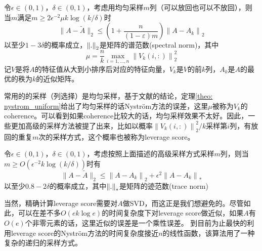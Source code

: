 \begin{theorem}
    \label{theo: nystrom_uniform}
    令$\epsilon \in (0,1)$，$\delta \in (0,1)$，考虑用均匀采样$m$列（可以放回也可以不放回），则当$m$满足$m \geq 2 \epsilon^{-2} \mu k \log (k / \delta)$时
    \begin{equation*}
        \|A-\tilde{A}\|_{2} \leq\left(1+\frac{n}{(1-\varepsilon) m}\right)\left\|A-A_{k}\right\|_{2}
    \end{equation*}
    以至少$1-3\delta$的概率成立，$\left\lVert.\right\rVert_2$是矩阵的谱范数(spectral norm)，其中
    \begin{equation*}
        \mu=\frac{n}{k} \max _{i=1, \ldots, n}\left\|V_{k}(i,:)\right\|_{2}^{2}
    \end{equation*}
    记$V$是将$A$的特征值从大到小排序后对应的特征向量，$V_{k}$是$V$的前$k$列，$A_k$是$A$的最优的秩为$k$的近似矩阵。
\end{theorem}
常用的的采样（列选择）是均匀采样，基于文献\cite{gittens2016revisiting}的结论，定理\ref{theo: nystrom_uniform}给出了均匀采样的话Nyström方法的误差，这里$\mu$被称为$V_k$的coherence。可以看到如果coherence比较大的话，均匀采样效果不太好。因此，一些更加高级的采样方法被提了出来，比如以概率$\left\|V_{k}(i,:)\right\|_{2}^{2}/k$采样第$i$列，有放回的重复$m$次的采样方式，这个概率也被称为leverage score。
\begin{theorem}
    令$\epsilon \in (0,1)$，$\delta \in (0,1)$，考虑按照上面描述的高级采样方式采样$m$列，则当$m \geq O\left(\epsilon^{-2} k \log (k / \delta)\right)$时有
    \begin{equation*}
        \|A-\tilde{A}\|_{2} \leq\left\|A-A_{k}\right\|_{2}+\epsilon^{2}\left\|A-A_{k}\right\|_{*}
    \end{equation*}
    以至少$0.8-2\delta$的概率成立，其中$\left\lVert.\right\rVert_{*}$是矩阵的迹范数(trace norm)
\end{theorem}
当然，精确计算leverage score需要对$A$做SVD，而这正是我们想避免的。尽管如此，可以在差不多$O(ek \log e)$的时间复杂度下对leverage score做近似，如果$A$有$O(e)$个非零元素的话，这里近似的误差是一个乘性误差。
到目前为止最快的利用leverage score的Nyström方法的时间复杂度接近$n$的线性函数，该算法用了一种复杂的递归的采样方式。

